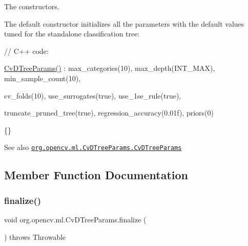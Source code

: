 The constructors.

The default constructor initializes all the parameters with the default values tuned for the standalone classification tree\+:

{\ttfamily }

{\ttfamily }

{\ttfamily }

{\ttfamily // C++ code\+:}

{\ttfamily }

{\ttfamily }

{\ttfamily \mbox{\hyperlink{classorg_1_1opencv_1_1ml_1_1_cv_d_tree_params_a0586bbb4381a2af419f472205c98b88e}{Cv\+D\+Tree\+Params()}} \+: max\+\_\+categories(10), max\+\_\+depth(\+I\+N\+T\+\_\+\+M\+A\+X), min\+\_\+sample\+\_\+count(10),}

{\ttfamily }

{\ttfamily }

{\ttfamily cv\+\_\+folds(10), use\+\_\+surrogates(true), use\+\_\+1se\+\_\+rule(true),}

{\ttfamily }

{\ttfamily }

{\ttfamily truncate\+\_\+pruned\+\_\+tree(true), regression\+\_\+accuracy(0.\+01f), priors(0)}

{\ttfamily }

{\ttfamily }

{\ttfamily \{\}}

{\ttfamily }

{\ttfamily \begin{DoxySeeAlso}{See also}
\href{http://docs.opencv.org/modules/ml/doc/decision_trees.html#cvdtreeparams-cvdtreeparams}{\tt org.\+opencv.\+ml.\+Cv\+D\+Tree\+Params.\+Cv\+D\+Tree\+Params} 
\end{DoxySeeAlso}
}

\subsection{Member Function Documentation}
\mbox{\label{classorg_1_1opencv_1_1ml_1_1_cv_d_tree_params_a7eb1b8c252c7b6e2287d3d42be1137ba}} 
\subsubsection{\texorpdfstring{finalize()}{finalize()}}
{\footnotesize\ttfamily void org.\+opencv.\+ml.\+Cv\+D\+Tree\+Params.\+finalize (\begin{DoxyParamCaption}{ }\end{DoxyParamCaption}) throws Throwable\hspace{0.3cm}{\ttfamily [protected]}}

